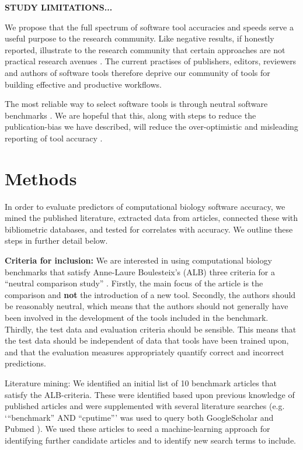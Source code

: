 \documentclass[fleqn,10pt]{SelfArx} %
\begin{document}
{\bf STUDY LIMITATIONS...}


We propose that the full spectrum of software tool accuracies and
speeds serve a useful purpose to the research community. Like negative
results, if honestly reported, illustrate to the research community
that certain approaches are not practical research avenues
\cite{Ioannidis2005-xh,Workman1999-au,Rivas2000-fb}.
The current
practises of publishers, editors, reviewers and authors of software
tools therefore deprive our community of tools for building effective
and productive workflows.

The most reliable way to select software tools is through neutral
software benchmarks \cite{Boulesteix2013-vb}. We are hopeful that
this, along with steps to reduce the publication-bias we have
described, will reduce the over-optimistic and misleading reporting of
tool accuracy \cite{Boulesteix2010-te,Jelizarow2010-zf,Norel2011-cq}.


\section*{Methods}
In order to evaluate predictors of computational biology software
accuracy, we mined the published literature, extracted data from
articles, connected these with bibliometric databases, and tested for
correlates with accuracy. We outline these steps in further detail
below.

\textbf{Criteria for inclusion:} We are interested in using
computational biology benchmarks that satisfy Anne-Laure Boulesteix’s
(ALB) three criteria for a “neutral comparison study”
\cite{Boulesteix2013-vb}. Firstly, the main focus of the article is
the comparison and \textbf{not} the introduction of a new
tool. Secondly, the authors should be reasonably neutral, which means
that the authors should not generally have been involved in the
development of the tools included in the benchmark. Thirdly, the test
data and evaluation criteria should be sensible. This means that the
test data should be independent of data that tools have been trained
upon, and that the evaluation measures appropriately quantify correct
and incorrect predictions.

Literature mining: We identified an initial list of 10 benchmark
articles that satisfy the ALB-criteria. These were identified based
upon previous knowledge of published articles and were supplemented
with several literature searches (e.g. ‘“benchmark” AND “cputime”’ was
used to query both GoogleScholar and Pubmed
\cite{Sayers2010-vm,McEntyre2001-fl}). We used these articles to seed
a machine-learning approach for identifying further candidate articles
and to identify new search terms to include.
\end{document}
